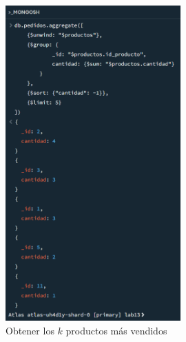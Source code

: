 \begin{figure}[H]
    \centering
    \includegraphics[width=0.6\textwidth]{./p1_kmasvendidos.png}
    \caption{Obtener los $k$ productos más vendidos}\label{fig:kmasvendidos}
\end{figure}

